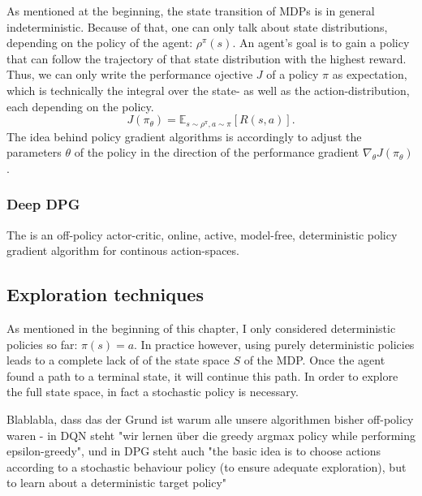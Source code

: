 As mentioned at the beginning, the state transition of MDPs is in general indeterministic. Because of that, one can only talk about state distributions, depending on the policy of the agent: $\rho^\pi(s)$. An agent's goal is to gain a policy that can follow the trajectory of that state distribution with the highest  reward. Thus, we can only write the performance ojective $J$ of a policy $\pi$ as expectation, which is technically the integral over the state- as well as the action-distribution, each depending on the policy.
\begin{equation}
	J(\pi_\theta) = \mathds{E}_{s\sim\rho^\pi,a\sim\pi}[R(s,a)].
\end{equation}
The idea behind policy gradient algorithms is accordingly to adjust the parameters $\theta$ of the policy in the direction of the performance gradient $\nabla_{\theta}J(\pi_\theta)$.

\subsubsection*{Deep DPG}

The  is an off-policy actor-critic, online, active, model-free, deterministic policy gradient algorithm for continous action-spaces.


\subsection{Exploration techniques}

As mentioned in the beginning of this chapter, I only considered deterministic policies so far: $\pi(s) = a$. In practice however, using purely deterministic policies leads to a complete lack of  of the state space $S$ of the MDP. Once the agent found a path to a terminal state, it will continue  this path. In order to explore the full state space, in fact a stochastic policy is necessary.

Blablabla, dass das der Grund ist warum alle unsere algorithmen bisher off-policy waren - in DQN steht "wir lernen über die greedy argmax policy while performing epsilon-greedy", und in DPG steht auch "the basic idea is to choose actions according to a stochastic behaviour policy (to ensure adequate exploration), but to learn about a deterministic target policy"

